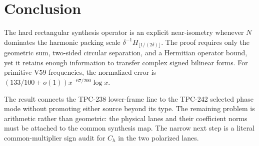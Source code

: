 \section{Conclusion}

The hard rectangular synthesis operator is an explicit near-isometry whenever
$N$ dominates the harmonic packing scale
$\delta^{-1}H_{\lfloor1/(2\delta)\rfloor}$.  The proof requires only the
geometric sum, two-sided circular separation, and a Hermitian operator bound,
yet it retains enough information to transfer complex signed bilinear forms.
For primitive V59 frequencies, the normalized error is
$(133/100+o(1))x^{-67/200}\log x$.

The result connects the TPC-238 lower-frame line to the TPC-242 selected phase
mode without promoting either source beyond its type.  The remaining problem
is arithmetic rather than geometric: the physical lanes and their coefficient
norms must be attached to the common synthesis map.  The narrow next step is a
literal common-multiplier sign audit for $C_h$ in the two polarized lanes.
